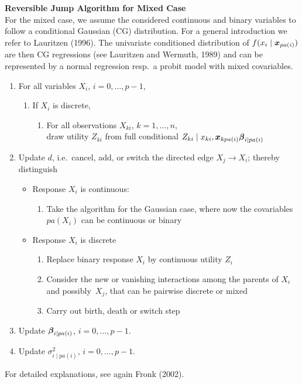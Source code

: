 {\bf Reversible Jump Algorithm for Mixed Case}\\[0.2cm]
%
 For the mixed case, we assume
the considered continuous and binary variables to follow a
conditional Gaussian (CG) distribution. For a general introduction
we refer to Lauritzen (1996). The univariate conditioned
distribution of $f(x_i \mid \mbox{\boldmath $x$}_{pa(i)})$ are then CG regressions
(see Lauritzen and Wermuth, 1989) and can be represented by a
normal regression resp.~a probit model with mixed covariables.
\begin{enumerate}
\item For all variables $X_i$, $i=0, \dots, p-1$,
    \begin{enumerate}
       \item[] If $X_i$ is discrete,
            \begin{enumerate}
            \item[] For all observations $X_{ki}$, $k=1, \dots, n$,  \\
                    draw utility $Z_{ki}$ from full conditional $Z_{ki} \mid x_{ki}, \mbox{\boldmath $x$}_{k pa(i)} \mbox{\boldmath $\beta$}_{i \mid pa(i)}$
            \end{enumerate}
    \end{enumerate}
\item Update $d$, i.e.~cancel, add, or switch the directed edge $X_j \rightarrow X_i$;
      thereby distinguish
    \begin{itemize}
    \item Response $X_i$ is continuous:
    \begin{enumerate}
     \item Take the algorithm for the Gaussian case, where now the covariables
            $pa(X_i)$ can be continuous or binary
     \end{enumerate}
    \item Response $X_i$ is discrete
     \begin{enumerate}
     \item Replace binary response $X_i$ by continuous utility $Z_i$
     \item Consider the new or vanishing interactions among the parents of
     $X_i$ and possibly~$X_j$, that can be pairwise discrete or mixed
     \item Carry out birth, death or switch step
     \end{enumerate}
    \end{itemize}
\item Update $\mbox{\boldmath $\beta$}_{i\mid pa(i)}$, $i=0, \dots, p-1$.
\item Update $\sigma^2_{i\mid pa(i)}$, $i=0, \dots, p-1$.
\end{enumerate}
%
For detailed explanations, see again Fronk (2002).

